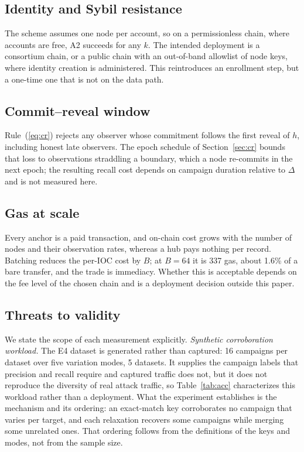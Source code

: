 \documentclass[conference]{IEEEtran}
\begin{document}
\subsection{Identity and Sybil resistance}
The scheme assumes one node per account, so on a permissionless chain, where accounts are free, A2 succeeds for any $k$. The intended deployment is a consortium chain, or a public chain with an out-of-band allowlist of node keys, where identity creation is administered. This reintroduces an enrollment step, but a one-time one that is not on the data path.

\subsection{Commit--reveal window}
\label{sec:cr-window}
Rule~(\ref{eq:cr}) rejects any observer whose commitment follows the first reveal of $h$, including honest late observers. The epoch schedule of Section~\ref{sec:cr} bounds that loss to observations straddling a boundary, which a node re-commits in the next epoch; the resulting recall cost depends on campaign duration relative to $\Delta$ and is not measured here.

\subsection{Gas at scale}
Every anchor is a paid transaction, and on-chain cost grows with the number of nodes and their observation rates, whereas a hub pays nothing per record. Batching reduces the per-IOC cost by $B$; at $B=64$ it is 337 gas, about 1.6\% of a bare transfer, and the trade is immediacy. Whether this is acceptable depends on the fee level of the chosen chain and is a deployment decision outside this paper.

\subsection{Threats to validity}
\label{sec:validity}
We state the scope of each measurement explicitly.
\emph{Synthetic corroboration workload.} The E4 dataset is generated rather than captured: 16 campaigns per dataset over five variation modes, 5 datasets. It supplies the campaign labels that precision and recall require and captured traffic does not, but it does not reproduce the diversity of real attack traffic, so Table~\ref{tab:acc} characterizes this workload rather than a deployment. What the experiment establishes is the mechanism and its ordering: an exact-match key corroborates no campaign that varies per target, and each relaxation recovers some campaigns while merging some unrelated ones. That ordering follows from the definitions of the keys and modes, not from the sample size.
\end{document}
